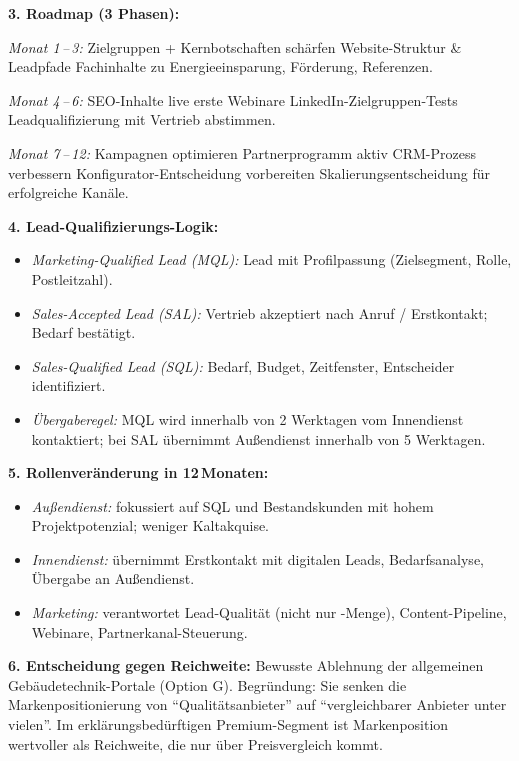 \documentclass[11pt,a4paper,oneside]{article}
\begin{document}
\begin{loesungbox}
\textbf{3. Roadmap (3 Phasen):}

\emph{Monat 1\,--\,3:} Zielgruppen + Kernbotschaften schärfen \textperiodcentered{} Website-Struktur \& Leadpfade \textperiodcentered{} Fachinhalte zu Energieeinsparung, Förderung, Referenzen.

\emph{Monat 4\,--\,6:} SEO-Inhalte live \textperiodcentered{} erste Webinare \textperiodcentered{} LinkedIn-Zielgruppen-Tests \textperiodcentered{} Leadqualifizierung mit Vertrieb abstimmen.

\emph{Monat 7\,--\,12:} Kampagnen optimieren \textperiodcentered{} Partnerprogramm aktiv \textperiodcentered{} CRM-Prozess verbessern \textperiodcentered{} Konfigurator-Entscheidung vorbereiten \textperiodcentered{} Skalierungsentscheidung für erfolgreiche Kanäle.

\textbf{4. Lead-Qualifizierungs-Logik:}
\begin{itemize}
  \item \emph{Marketing-Qualified Lead (MQL):} Lead mit Profilpassung (Zielsegment, Rolle, Postleitzahl).
  \item \emph{Sales-Accepted Lead (SAL):} Vertrieb akzeptiert nach Anruf / Erstkontakt; Bedarf bestätigt.
  \item \emph{Sales-Qualified Lead (SQL):} Bedarf, Budget, Zeitfenster, Entscheider identifiziert.
  \item \emph{Übergaberegel:} MQL wird innerhalb von 2 Werktagen vom Innendienst kontaktiert; bei SAL übernimmt Außendienst innerhalb von 5 Werktagen.
\end{itemize}

\textbf{5. Rollenveränderung in 12\,Monaten:}
\begin{itemize}
  \item \emph{Außendienst:} fokussiert auf SQL und Bestandskunden mit hohem Projektpotenzial; weniger Kaltakquise.
  \item \emph{Innendienst:} übernimmt Erstkontakt mit digitalen Leads, Bedarfsanalyse, Übergabe an Außendienst.
  \item \emph{Marketing:} verantwortet Lead-Qualität (nicht nur -Menge), Content-Pipeline, Webinare, Partnerkanal-Steuerung.
\end{itemize}

\textbf{6. Entscheidung gegen Reichweite:}
Bewusste Ablehnung der allgemeinen Gebäudetechnik-Portale (Option G). Begründung: Sie senken die Markenpositionierung von ``Qualitätsanbieter'' auf ``vergleichbarer Anbieter unter vielen''. Im erklärungsbedürftigen Premium-Segment ist Markenposition wertvoller als Reichweite, die nur über Preisvergleich kommt.


\end{loesungbox}
\end{document}
